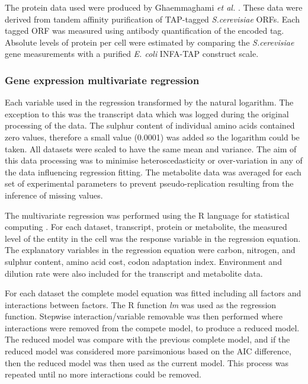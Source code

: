 The protein data used were produced by Ghaemmaghami \emph{et al.} \cite{ghaemmaghami2003}. These data were derived from tandem affinity purification of TAP-tagged \emph{S.cerevisiae} ORFs. Each tagged ORF was measured using antibody quantification of the encoded tag. Absolute levels of protein per cell were estimated by comparing the \emph{S.cerevisiae} gene measurements with a purified \emph{E. coli} INFA-TAP construct scale.

\subsubsection{Gene expression multivariate regression}

Each variable used in the regression transformed by the natural logarithm. The exception to this was the transcript data which was logged during the original processing of the data. The sulphur content of individual amino acids contained zero values, therefore a small value (0.0001) was added so the logarithm could be taken. All datasets were scaled to have the same mean and variance. The aim of this data processing was to minimise heteroscedasticity or over-variation in any of the data influencing regression fitting. The metabolite data was averaged for each set of experimental parameters to prevent pseudo-replication resulting from the inference of missing values.

The multivariate regression was performed using the R language for statistical computing \cite{R}. For each dataset, transcript, protein or metabolite, the measured level of the entity in the cell was the response variable in the regression equation. The explanatory variables in the regression equation were carbon, nitrogen, and sulphur content, amino acid cost, codon adaptation index. Environment and dilution rate were also included for the transcript and metabolite data.

For each dataset the complete model equation was fitted including all factors and interactions between factors. The R function \emph{lm} was used as the regression function. Stepwise interaction/variable removable was then performed where interactions were removed from the compete model, to produce a reduced model. The reduced model was compare with the previous complete model, and if the reduced model was considered more parsimonious based on the AIC difference, then the reduced model was then used as the current model. This process was repeated until no more interactions could be removed.

